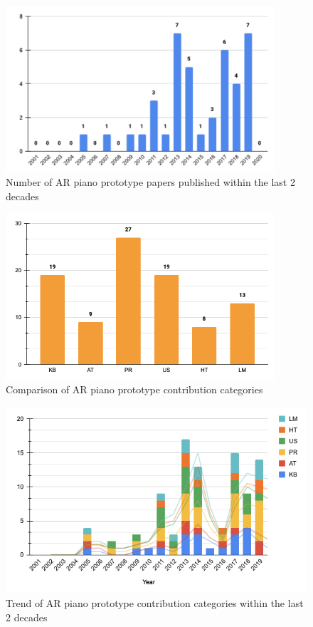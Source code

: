 \documentclass[manuscript,screen]{acmart}
\begin{document}
\begin{figure}
    \centering
    \includegraphics[width=10cm]{figures/articlexyear.png}
    \caption{ Number of AR piano prototype papers published within the last 2 decades }
    \label{fig:articleyeartrend}
\end{figure}

\begin{figure}
    \centering
    \includegraphics[width=10cm]{figures/typecount.png}
    \caption{Comparison of AR piano prototype contribution categories}
    \label{fig:typecount}
\end{figure}

\begin{figure}
    \centering
    \includegraphics[width=15cm]{figures/typeyeartrend.png}
    \caption{Trend of AR piano prototype contribution categories within the last 2 decades}
    \label{fig:typeyeartrend}
\end{figure}
\end{document}
